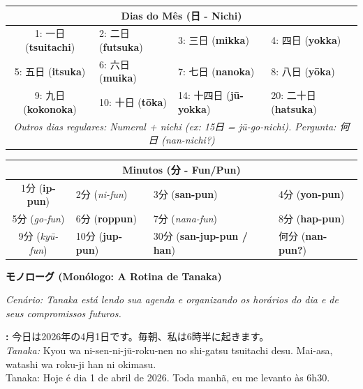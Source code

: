 \documentclass[12pt,a4paper]{article}
\begin{document}
\noindent
\small
\begin{tabularx}{\textwidth}{c X X X}
\toprule
\multicolumn{4}{c}{\textbf{\color{jpnavy}Dias do Mês (日 - Nichi)}} \\
\midrule
1: 一日 (\textbf{tsuitachi}) & 2: 二日 (\textbf{futsuka}) & 3: 三日 (\textbf{mikka}) & 4: 四日 (\textbf{yokka}) \\
5: 五日 (\textbf{itsuka}) & 6: 六日 (\textbf{muika}) & 7: 七日 (\textbf{nanoka}) & 8: 八日 (\textbf{yōka}) \\
9: 九日 (\textbf{kokonoka}) & 10: 十日 (\textbf{tōka}) & 14: 十四日 (\textbf{jū-yokka}) & 20: 二十日 (\textbf{hatsuka}) \\
\midrule
\multicolumn{4}{c}{\textit{Outros dias regulares: Numeral + nichi (ex: 15日 = jū-go-nichi). Pergunta: 何日 (nan-nichi?)}} \\
\bottomrule
\end{tabularx}

\vspace{0.3cm}

\noindent
\small
\begin{tabularx}{\textwidth}{c X X X}
\toprule
\multicolumn{4}{c}{\textbf{\color{jpnavy}Minutos (分 - Fun/Pun)}} \\
\midrule
1分 (\textbf{ip-pun}) & 2分 (\textit{ni-fun}) & 3分 (\textbf{san-pun}) & 4分 (\textbf{yon-pun}) \\
5分 (\textit{go-fun}) & 6分 (\textbf{roppun}) & 7分 (\textit{nana-fun}) & 8分 (\textbf{hap-pun}) \\
9分 (\textit{kyū-fun}) & 10分 (\textbf{jup-pun}) & 30分 (\textbf{san-jup-pun / han}) & 何分 (\textbf{nan-pun?}) \\
\bottomrule
\end{tabularx}

\newpage

\begin{center}
    {\LARGE\bfseries モノローグ (Monólogo: A Rotina de Tanaka)}
\end{center}

\textit{Cenário: Tanaka está lendo sua agenda e organizando os horários do dia e de seus compromissos futuros.}

\vspace{0.8em}

\textbf{:} 今日は2026年の4月1日です。毎朝、私は6時半に起きます。\\
\textit{Tanaka:} Kyou wa ni-sen-ni-jū-roku-nen no shi-gatsu tsuitachi desu. Mai-asa, watashi wa roku-ji han ni okimasu.\\
Tanaka: Hoje é dia 1 de abril de 2026. Toda manhã, eu me levanto às 6h30.
\end{document}
